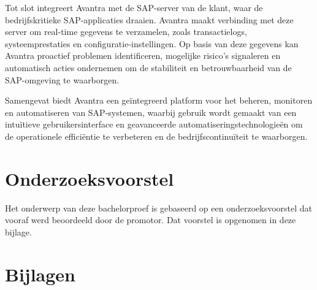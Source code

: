 \documentclass[dutch,dit,thesis]{hogentreport}
\begin{document}
Tot slot integreert Avantra met de SAP-server van de klant, waar de bedrijfskritieke SAP-applicaties draaien. Avantra maakt verbinding met deze server om real-time gegevens te verzamelen, zoals transactielogs, systeemprestaties
 en configuratie-instellingen. Op basis van deze gegevens kan Avantra proactief problemen identificeren, mogelijke risico's signaleren en automatisch acties ondernemen om de stabiliteit en betrouwbaarheid van de SAP-omgeving te waarborgen.

Samengevat biedt Avantra een geïntegreerd platform voor het beheren, monitoren en automatiseren van SAP-systemen, waarbij gebruik wordt gemaakt van een intuïtieve gebruikersinterface en geavanceerde 
automatiseringstechnologieën om de operationele efficiëntie te verbeteren en de bedrijfscontinuïteit te waarborgen.




%
%

%


\appendix

\chapter{Onderzoeksvoorstel}

Het onderwerp van deze bachelorproef is gebaseerd op een onderzoeksvoorstel dat vooraf werd beoordeeld door de promotor. Dat voorstel is opgenomen in deze bijlage.










%

\chapter{Bijlagen}
\end{document}
